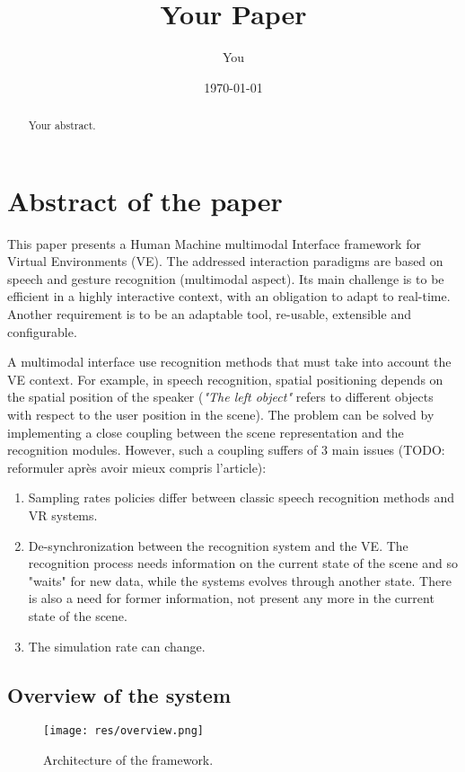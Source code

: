 \documentclass[a4paper]{article}
\title{Your Paper}
\author{You}
\date{\today}
\begin{document}
\maketitle

\begin{abstract}
Your abstract.
\end{abstract}

\section{Abstract of the paper}

This paper presents a Human Machine multimodal Interface framework for Virtual Environments (VE). The addressed interaction paradigms are based on speech and gesture recognition (multimodal aspect). Its main challenge is to be efficient in a highly interactive context, with an obligation to adapt to real-time. Another requirement is to be an adaptable tool, re-usable, extensible and configurable.

A multimodal interface use recognition methods that must take into account the VE context. For example, in speech recognition, spatial positioning depends on the spatial position of the speaker (\textit{"The left object"} refers to different objects with respect to the user position in the scene). The problem can be solved by implementing a close coupling between the scene representation and the recognition modules. However, such a coupling suffers of 3 main issues (TODO: reformuler après avoir mieux compris l'article):
\begin{enumerate}
	\item Sampling rates policies differ between classic speech recognition methods and VR systems.
	\item De-synchronization between the recognition system and the VE. The recognition process needs information on the current state of the scene and so "waits" for new data, while the systems evolves through another state. There is also a need for former information, not present any more in the current state of the scene.
	\item The simulation rate can change.
\end{enumerate}

\subsection{Overview of the system}
\label{sec:overview}
\begin{figure}
\centering
\texttt{[image: res/overview.png]}
\caption{\label{fig:overview}Architecture of the framework.}
\end{figure}
\end{document}
